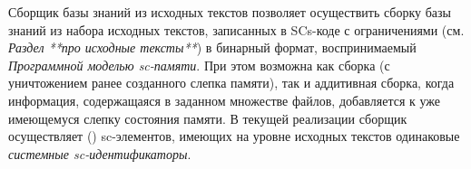 \begin{scnitemize}
\begin{scnitemize}
Сборщик базы знаний из исходных текстов позволяет осуществить сборку базы знаний из набора исходных текстов, записанных
в SCs-коде с ограничениями (см. \textit{Раздел **про исходные тексты**}) в бинарный формат, воспринимаемый
\textit{Программной моделью sc-памяти}. При этом возможна как сборка  (с уничтожением ранее созданного
слепка памяти), так и аддитивная сборка, когда информация, содержащаяся в заданном множестве файлов, добавляется к уже
имеющемуся слепку состояния памяти. В текущей реализации сборщик осуществляет  ()
sc-элементов, имеющих на уровне исходных текстов одинаковые \textit{системные sc-идентификаторы}.

\begin{SCn}
\begin{scnindent}
\end{scnindent}
\end{SCn}


\end{scnitemize}
\end{scnitemize}
